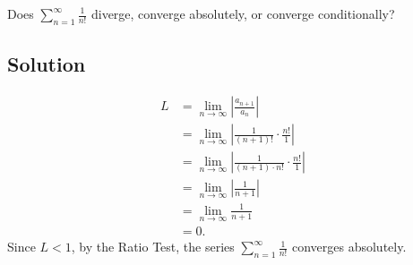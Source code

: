\documentclass{article}
\begin{document}
\noindent
Does $\displaystyle \sum_{n=1}^\infty \frac{1}{n!}$
diverge, converge absolutely, or converge conditionally?

\subsection*{Solution}

\begin{align*}
L&=\lim_{n \to \infty} \left|\frac{a_{n+1}}{a_n}\right|\\
&= \lim_{n \to \infty} \left| \frac{1}{(n+1)!} \cdot \frac{n!}{1}\right|\\
&= \lim_{n \to \infty} \left| \frac{1}{(n+1) \cdot n!} \cdot \frac{n!}{1}\right|\\
&= \lim_{n \to \infty} \left| \frac{1}{n+1}\right|\\
&= \lim_{n \to \infty}  \frac{1}{n+1}\\
&= 0.
\end{align*}
Since $L < 1$, by the Ratio Test, the series $\displaystyle \sum_{n=1}^\infty \frac{1}{n!}$ converges absolutely.
\end{document}
